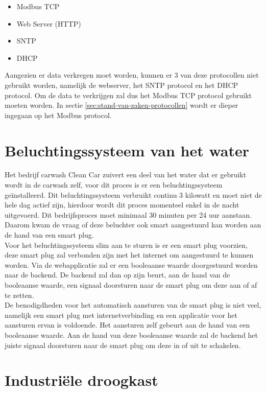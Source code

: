 \begin{itemize}
    \item Modbus TCP
    \item Web Server (HTTP)
    \item SNTP
    \item DHCP
\end{itemize}

Aangezien er data verkregen moet worden, kunnen er 3 van deze protocollen niet gebruikt worden, namelijk de webserver, het SNTP protocol en het DHCP protocol. Om de data te verkrijgen zal dus het Modbus TCP protocol gebruikt moeten worden. In sectie \ref{sec:stand-van-zaken-protocollen} wordt er dieper ingegaan op het Modbus protocol.

\section{Beluchtingssysteem van het water}
\label{sec:stand-van-zaken-beluchtingssysteem}

Het bedrijf carwash Clean Car zuivert een deel van het water dat er gebruikt wordt in de carwash zelf, voor dit proces is er een beluchtingssysteem geïnstalleerd. Dit beluchtingssysteem verbruikt continu 3 kilowatt en moet niet de hele dag actief zijn, hierdoor wordt dit proces momenteel enkel in de nacht uitgevoerd. Dit bedrijfsproces moet minimaal 30 minuten per 24 uur aanstaan. Daarom kwam de vraag of deze beluchter ook smart aangestuurd kan worden aan de hand van een smart plug.\\

Voor het beluchtingssysteem slim aan te sturen is er een smart plug voorzien, deze smart plug zal verbonden zijn met het internet om aangestuurd te kunnen worden. Via de webapplicatie zal er een booleaanse waarde doorgestuurd worden naar de backend. De backend zal dan op zijn beurt, aan de hand van de booleaanse waarde, een signaal doorsturen naar de smart plug om deze aan of af te zetten.\\

De benodigdheden voor het automatisch aansturen van de smart plug is niet veel, namelijk een smart plug met internetverbinding en een applicatie voor het aansturen ervan is voldoende. Het aansturen zelf gebeurt aan de hand van een booleaanse waarde. Aan de hand van deze booleaanse waarde zal de backend het juiste signaal doorsturen naar de smart plug om deze in of uit te schakelen.\\

\section{Industriële droogkast}
\label{sec:stand-van-zaken-droogkast}

